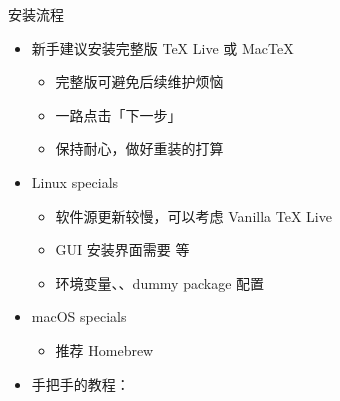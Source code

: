 \begin{frame}{安装流程}
\begin{itemize}
  \item 新手建议安装完整版 \TeX{} Live 或 Mac\TeX{}

    \begin{itemize}
      \item 完整版可避免后续维护烦恼
      \item 一路点击「下一步」
      \item 保持耐心，做好重装的打算
    \end{itemize} \pause

  \item Linux specials

    \begin{itemize}
      \item 软件源更新较慢，可以考虑 Vanilla \TeX{} Live
      \item GUI 安装界面需要  等
      \item 环境变量、、dummy package 配置
    \end{itemize}

  \item macOS specials

    \begin{itemize}
      \item 推荐 Homebrew \href{https://brew.sh/}{\faBeer}
    \end{itemize}

  \item 手把手的教程：
\end{itemize}
\end{frame}

